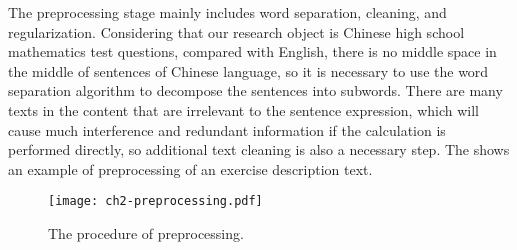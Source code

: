 
The preprocessing stage mainly includes word separation, cleaning, and regularization. Considering that our research object is Chinese high school mathematics test questions, compared with English, there is no middle space in the middle of sentences of Chinese language, so it is necessary to use the word separation algorithm to decompose the sentences into subwords. There are many texts in the content that are irrelevant to the sentence expression, which will cause much interference and redundant information if the calculation is performed directly, so additional text cleaning is also a necessary step. The \figname{\ref{fig:ch2-model-preprocessing}} shows an example of preprocessing of an exercise description text.

\begin{figure}[htbp!]
    \centering
    \texttt{[image: ch2-preprocessing.pdf]}
    \caption{The procedure of preprocessing.}\label{fig:ch2-model-preprocessing}
\end{figure}

